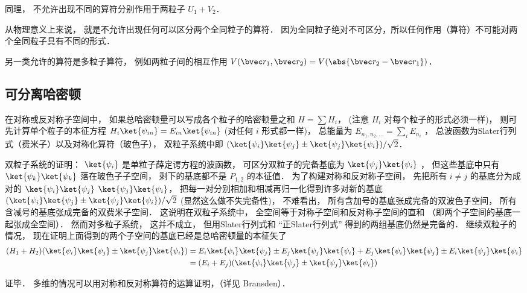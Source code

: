 同理， 不允许出现不同的算符分别作用于两粒子 $U_1 + V_2$．

从物理意义上来说， 就是不允许出现任何可以区分两个全同粒子的算符． 因为全同粒子绝对不可区分，所以任何作用（算符）不可能对两个全同粒子具有不同的形式．

另一类允许的算符是多粒子算符， 例如两粒子间的相互作用 $V(\bvec r_1, \bvec r_2) = V(\abs{\bvec r_2 - \bvec r_1})$．

\subsection{可分离哈密顿}
在对称或反对称子空间中， 如果总哈密顿量可以写成各个粒子的哈密顿量之和 $H = \sum H_i$， (注意 $H_i$ 对每个粒子的形式必须一样)， 则可先计算单个粒子的本征方程 $H_i \ket{\psi_{in}} = E_{in}\ket{\psi_{in}}$ (对任何 $i$ 形式都一样)， 总能量为 $E_{n_1,n_2,\dots} = \sum_i E_{n_i}$ ， 总波函数为Slater行列式（费米子）以及对称化算符（玻色子）， 双粒子系统中即 $(\ket{\psi_i}\ket{\psi_j} \pm \ket{\psi_j}\ket{\psi_i})/\sqrt{2}$．

双粒子系统的证明： $\ket{\psi_i}$ 是单粒子薛定谔方程的波函数， 可区分双粒子的完备基底为 $\ket{\psi_j}\ket{\psi_i}$ ， 但这些基底中只有 $\ket{\psi_k}\ket{\psi_k}$ 落在玻色子子空间， 剩下的基底都不是 $P_{1,2}$ 的本征值． 为了构建对称和反对称子空间， 先把所有 $i \ne j$ 的基底分为成对的 $\ket{\psi_i}\ket{\psi_j}$ $\ket{\psi_j}\ket{\psi_i}$， 把每一对分别相加和相减再归一化得到许多对新的基底 $(\ket{\psi_i}\ket{\psi_j} \pm \ket{\psi_j}\ket{\psi_i})/\sqrt{2}$ (显然这么做不失完备性)， 不难看出， 所有含加号的基底张成完备的双波色子空间， 所有含减号的基底张成完备的双费米子空间． 这说明在双粒子系统中， 全空间等于对称子空间和反对称子空间的直和 （即两个子空间的基底一起张成全空间）． 然而对多粒子系统， 这并不成立， 但用Slater行列式和 “正Slater行列式” 得到的两组基底仍然是完备的． 继续双粒子的情况， 现在证明上面得到的两个子空间的基底已经是总哈密顿量的本征矢了
\begin{equation}
\begin{aligned}
(H_1 + H_2) (\ket{\psi_i}\ket{\psi_j} \pm \ket{\psi_j}\ket{\psi_i}) &= E_i \ket{\psi_i}\ket{\psi_j} \pm E_j \ket{\psi_j}\ket{\psi_i} + E_j \ket{\psi_i}\ket{\psi_j} \pm E_i \ket{\psi_j}\ket{\psi_i}\\
&= (E_i + E_j) (\ket{\psi_i}\ket{\psi_j} \pm \ket{\psi_j}\ket{\psi_i})
\end{aligned}
\end{equation}

证毕．
多维的情况可以用对称和反对称算符的运算证明，（详见 Bransden）．

